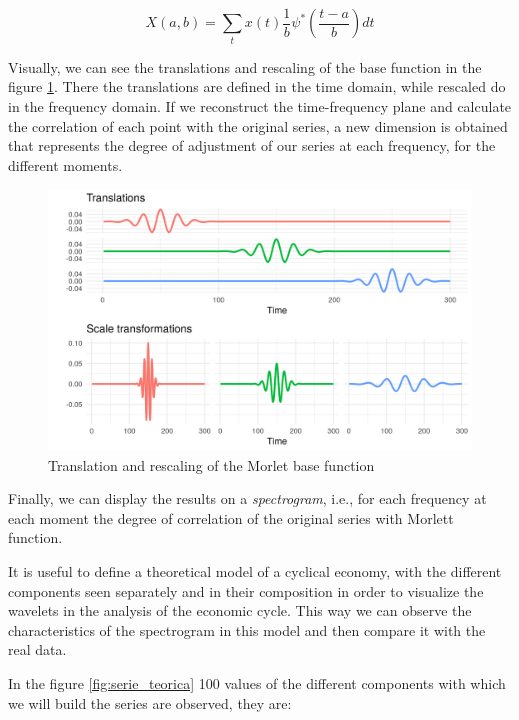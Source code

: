 \documentclass[a4paper,10cpi]{article}
\begin{document}
	$$
	X(a,b)=\sum_{t} x(t)   \frac{1}{b} \psi^*\left(\frac{t-a}{b}\right)dt
	$$
	
	Visually, we can see the translations and rescaling of the base function in the figure \ref{fig:morlet}. There the translations are defined in the time domain, while rescaled do in the frequency domain. If we reconstruct the time-frequency plane and calculate the correlation of each point with the original series, a new dimension is obtained that represents the degree of adjustment of our series at each frequency, for the different moments.
	
	\begin{figure}[H]
		\centering
		\includegraphics[width=\linewidth]{morelt_en.png}
		\caption{Translation and rescaling of the Morlet base function} \label{fig:morlet}
	\end{figure}
	
	Finally, we can display the results on a \textit{spectrogram}, i.e., for each frequency at each moment the degree of correlation of the original series with Morlett function.
	
	
	It is useful to define a theoretical model of a cyclical economy, with the different components seen separately and in their composition in order to visualize the wavelets in the analysis of the economic cycle. This way we can observe the characteristics of the spectrogram in this model and then compare it with the real data.
	
	In the figure \ref{fig:serie_teorica} 100 values of the different components with which we will build the series are observed, they are:
	
\end{document}
